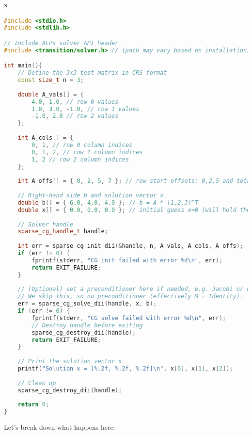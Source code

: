 \begin{lstlisting}[language=C++, label=lst:example, showstringspaces=false, basicstyle=\ttfamily\small, caption={Example program using ALP's CG solver API}]s

#include <stdio.h>
#include <stdlib.h>

// Include ALPs solver API header
#include <transition/solver.h> // (path may vary based on installation)

int main(){
    // Define the 3x3 test matrix in CRS format
    const size_t n = 3;
    
    double A_vals[] = {
        4.0, 1.0, // row 0 values
        1.0, 3.0, -1.0, // row 1 values
        -1.0, 2.0 // row 2 values
    };
    
    int A_cols[] = {
        0, 1, // row 0 column indices
        0, 1, 2, // row 1 column indices
        1, 2 // row 2 column indices
    };
    
    int A_offs[] = { 0, 2, 5, 7 }; // row start offsets: 0,2,5 and total nnz=7
    
    // Right-hand side b and solution vector x
    double b[] = { 6.0, 4.0, 4.0 }; // b = A * [1,2,3]^T
    double x[] = { 0.0, 0.0, 0.0 }; // initial guess x=0 (will hold the solution)
    
    // Solver handle
    sparse_cg_handle_t handle;
    
    int err = sparse_cg_init_dii(&handle, n, A_vals, A_cols, A_offs);
    if (err != 0) {
        fprintf(stderr, "CG init failed with error %d\n", err);
        return EXIT_FAILURE;
    }
    
    // (Optional) set a preconditioner here if needed, e.g. Jacobi or others.
    // We skip this, so no preconditioner (effectively M = Identity).
    err = sparse_cg_solve_dii(handle, x, b);
    if (err != 0) {
        fprintf(stderr, "CG solve failed with error %d\n", err);
        // Destroy handle before exiting
        sparse_cg_destroy_dii(handle);
        return EXIT_FAILURE;
    }
    
    // Print the solution vector x
    printf("Solution x = [%.2f, %.2f, %.2f]\n", x[0], x[1], x[2]);
    
    // Clean up
    sparse_cg_destroy_dii(handle);
    
    return 0;
}


\end{lstlisting}

Let’s break down what happens here:

